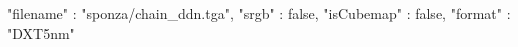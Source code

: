 { 
	"filename" : "sponza/chain_ddn.tga", 
	"srgb" : false,
	"isCubemap" : false,
	"format" : "DXT5nm"
}